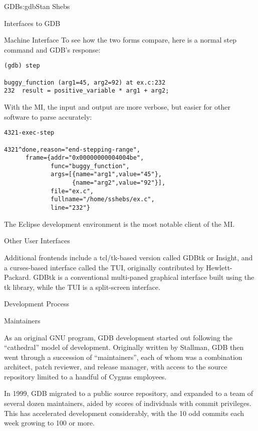 \begin{aosachapter}{GDB}{s:gdb}{Stan Shebs}
\begin{aosasect1}{Interfaces to GDB}
\begin{aosasect2}{Machine Interface}
To see how the two forms compare, here is a normal step command
and GDB's response:
\begin{verbatim}
(gdb) step

buggy_function (arg1=45, arg2=92) at ex.c:232
232  result = positive_variable * arg1 + arg2;
\end{verbatim}
With the MI, the input and output are more verbose, but easier for
other software to parse accurately:
\begin{verbatim}
4321-exec-step

4321^done,reason="end-stepping-range",
      frame={addr="0x00000000004004be",
             func="buggy_function",
             args=[{name="arg1",value="45"},
                   {name="arg2",value="92"}],
             file="ex.c",
             fullname="/home/sshebs/ex.c",
             line="232"}
\end{verbatim}

The Eclipse\cite{bib:eclipse-home} development environment is the most
notable client of the MI.

\end{aosasect2}

\begin{aosasect2}{Other User Interfaces}

Additional frontends include a tcl/tk-based version called GDBtk or
Insight, and a curses-based interface called the TUI, originally
contributed by Hewlett-Packard.  GDBtk is a conventional multi-paned
graphical interface built using the tk library, while the TUI is a
split-screen interface.

\end{aosasect2}

\end{aosasect1}

\begin{aosasect1}{Development Process}

\begin{aosasect2}{Maintainers}

As an original GNU program, GDB development started out following the
``cathedral'' model of development.  Originally written by Stallman,
GDB then went through a succession of ``maintainers'', each of whom
was a combination architect, patch reviewer, and release manager, with
access to the source repository limited to a handful of Cygnus
employees.

In 1999, GDB migrated to a public source repository, and expanded to a
team of several dozen maintainers, aided by scores of individuals with
commit privileges.  This has accelerated development considerably,
with the 10 odd commits each week growing to 100 or more.


\end{aosasect2}
\end{aosasect1}
\end{aosachapter}
